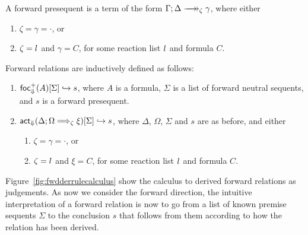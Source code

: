 \begin{definition}
  A forward presequent is a term of the form
  $\zfneuseq{\Gamma}{\Delta}{\zeta}{\gamma}$, where either

  \begin{enumerate}
  \item $\zeta = \gamma = \cdot$, or
  \item $\zeta = l_{}$ and $\gamma = C$, for some reaction list
    $l_{}$ and formula $C$.
  \end{enumerate}
\end{definition}

\begin{definition}
  Forward relations are inductively defined as follows:

  \begin{enumerate}
  \item $\textsf{foc}^+_{\Downarrow}(A) [\Sigma] \hookrightarrow s$, where $A$ is a formula, $\Sigma$ is a
    list of forward neutral sequents, and $s$ is a forward presequent.
  \item $\textsf{act}_{\Downarrow}(\Delta ; \Omega \Longrightarrow_{\zeta} \xi)  [\Sigma] \hookrightarrow s$,
    where $\Delta$, $\Omega$, $\Sigma$ and $s$ are as before, and either
    \begin{enumerate}
    \item $\zeta = \gamma = \cdot$, or
    \item $\zeta = l_{}$ and $\xi = C$, for some reaction list
      $l_{}$ and formula $C$.
    \end{enumerate}
  \end{enumerate}
\end{definition}

Figure~\ref{fig:fwdderrulecalculus} show the calculus to derived forward
relations as judgements. As now we consider the forward direction, the intuitive
interpretation of a forward relation is now to go from a list of known premise
sequents $\Sigma$ to the conclusion $s$ that follows from them according to how
the relation has been derived.

